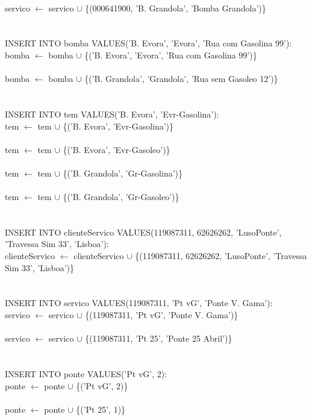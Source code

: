 \documentclass[a4paper]{article}
\begin{document}
\\
servico $\leftarrow$ servico $\cup$ \{(000641900, 'B. Grandola', 'Bomba Grandola')\}\\
\\
\\
INSERT INTO bomba VALUES('B. Evora', 'Evora', 'Rua com Gasolina 99'):\\
bomba $\leftarrow$ bomba $\cup$ \{('B. Evora', 'Evora', 'Rua com Gasolina 99')\}\\
\\
bomba $\leftarrow$ bomba $\cup$ \{('B. Grandola', 'Grandola', 'Rua sem Gasoleo 12')\}\\
\\
\\
INSERT INTO tem VALUES('B. Evora', 'Evr-Gasolina'):\\
tem $\leftarrow$ tem $\cup$ \{('B. Evora', 'Evr-Gasolina')\}\\
\\
tem $\leftarrow$ tem $\cup$ \{('B. Evora', 'Evr-Gasoleo')\}\\
\\
tem $\leftarrow$ tem $\cup$ \{('B. Grandola', 'Gr-Gasolina')\}\\
\\
tem $\leftarrow$ tem $\cup$ \{('B. Grandola', 'Gr-Gasoleo')\}\\
\\
\\
INSERT INTO clienteServico VALUES(119087311, 62626262, 'LusoPonte', 'Travessa Sim 33', 'Lisboa'):\\
clienteServico $\leftarrow$ clienteServico $\cup$ \{(119087311, 62626262, 'LusoPonte', 'Travessa Sim 33', 'Lisboa')\}\\
\\
\\
INSERT INTO servico VALUES(119087311, 'Pt vG', 'Ponte V. Gama'):\\
servico $\leftarrow$ servico $\cup$ \{(119087311, 'Pt vG', 'Ponte V. Gama')\}\\
\\
servico $\leftarrow$ servico $\cup$ \{(119087311, 'Pt 25', 'Ponte 25 Abril')\}\\
\\
\\
INSERT INTO ponte VALUES('Pt vG', 2):\\
ponte $\leftarrow$ ponte $\cup$ \{('Pt vG', 2)\}\\
\\
ponte $\leftarrow$ ponte $\cup$ \{('Pt 25', 1)\}\\
\end{document}
